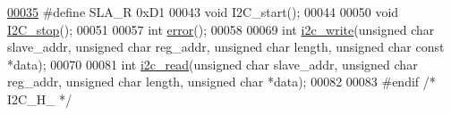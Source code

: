 \begin{DoxyCode}
\hypertarget{_i2_c_8h_source.tex_l00035}{}\hyperlink{_i2_c_8h_ae4af1f304be9d3202a445e7d6c235eaa}{00035} \textcolor{preprocessor}{#define SLA\_R 0xD1                      }
00043 \textcolor{preprocessor}{void I2C\_start();}
00044 
00050 \textcolor{keywordtype}{void} \hyperlink{_i2_c_8h_af8dcc1bcb3e1c6c0fcdca4cf599a239b}{I2C\_stop}();
00051 
00057 \textcolor{keywordtype}{int} \hyperlink{_i2_c_8h_ad1a5ba420409525ff5ab1be86ac5e526}{error}();
00058 
00069 \textcolor{keywordtype}{int} \hyperlink{_i2_c_8h_ac0f145afe8d662af199043939f4398d6}{i2c\_write}(\textcolor{keywordtype}{unsigned} \textcolor{keywordtype}{char} slave\_addr, \textcolor{keywordtype}{unsigned} \textcolor{keywordtype}{char} reg\_addr, \textcolor{keywordtype}{unsigned} \textcolor{keywordtype}{char} length, \textcolor{keywordtype}{unsigned} \textcolor{keywordtype}{
      char} \textcolor{keyword}{const} *data);
00070 
00081 \textcolor{keywordtype}{int} \hyperlink{_i2_c_8h_ac2d47e7a6c76f93f9b537c31a2986e7b}{i2c\_read}(\textcolor{keywordtype}{unsigned} \textcolor{keywordtype}{char} slave\_addr, \textcolor{keywordtype}{unsigned} \textcolor{keywordtype}{char} reg\_addr, \textcolor{keywordtype}{unsigned} \textcolor{keywordtype}{char} length, \textcolor{keywordtype}{unsigned} \textcolor{keywordtype}{char} 
      *data);
00082 
00083 \textcolor{preprocessor}{#endif }\textcolor{comment}{/* I2C\_H\_ */}\textcolor{preprocessor}{}
\end{DoxyCode}
